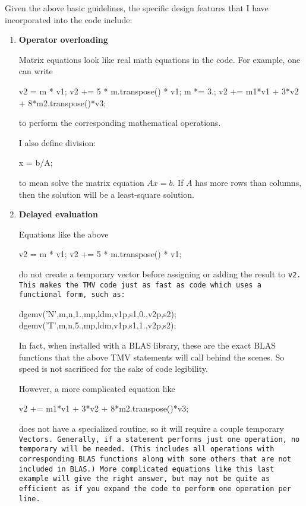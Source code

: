 Given the above basic guidelines, the specific design features that I 
have incorporated into the code include:

\begin{enumerate}
\item
\textbf{Operator overloading}

Matrix equations look like real math equations in the code. 
For example, one can write 
\begin{tmvcode}
v2 = m * v1;
v2 += 5 * m.transpose() * v1;
m *= 3.;
v2 += m1*v1 + 3*v2 + 8*m2.transpose()*v3;
\end{tmvcode}
to perform the corresponding mathematical operations.

I also define division:
\begin{tmvcode}
x = b/A;
\end{tmvcode}
to mean solve the matrix equation $A x = b$.  If $A$ has more rows than columns,
then the solution will be a least-square solution.

\item
\textbf{Delayed evaluation}

Equations like the above 
\begin{tmvcode}
v2 = m * v1;
v2 += 5 * m.transpose() * v1;
\end{tmvcode}
do not create a temporary vector before assigning or adding the result to \tt{v2}.  This makes 
the TMV code just as fast as code which uses a functional form, such as:
\begin{tmvcode}
dgemv('N',m,n,1.,mp,ldm,v1p,s1,0.,v2p,s2);
dgemv('T',m,n,5.,mp,ldm,v1p,s1,1.,v2p,s2);
\end{tmvcode}
In fact, when installed with a BLAS library, these are the exact 
BLAS functions that the above TMV statements will call behind the scenes.
So speed is not sacrificed for the sake of code legibility.

However, a more complicated equation like
\begin{tmvcode}
v2 += m1*v1 + 3*v2 + 8*m2.transpose()*v3;
\end{tmvcode}
does not have a specialized routine, 
so it will require a couple temporary \tt{Vector}s.
Generally, if a statement performs just one operation, no temporary will be needed.  
(This includes all operations with corresponding BLAS functions along with some others
that are not included in BLAS.)
More complicated equations like this last example will give the right answer, 
but may not be quite as efficient as if you expand
the code to perform one operation per line.


\end{enumerate}
